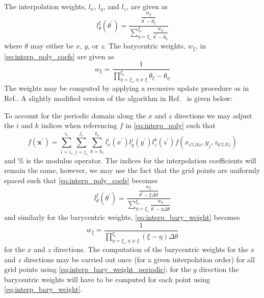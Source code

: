 \documentclass[11pt,letterpaper]{article}
\begin{document}
The interpolation weights, $l_x$, $l_y$, and $l_z$, are given as
\begin{equation}\label{eq:interp_poly_coefs}
  l_\theta^\xi(\theta^\prime) = \frac{\frac{w_\xi}{\theta^\prime - \theta_\xi}}{\sum_{\eta=\xi_s}^{\xi_e} \frac{w_{\eta}}{\theta^\prime - \theta_\eta} }
\end{equation}
where $\theta$ may either be $x$, $y$, or $z$. The barycentric weights, $w_\xi$, in \eqref{eq:interp_poly_coefs} are given as
\begin{equation}\label{eq:interp_bary_weight}
  w_\xi = \frac{1}{\prod_{\eta=\xi_s,\eta\neq \xi}^{\xi_e} \theta_\xi - \theta_\eta}
\end{equation}
The weights may be computed by applying a recursive update procedure as in Ref.\cite{Berrut2004}. A slightly modified version of the algorithm in Ref.~\cite{Berrut2004}  is given below:
\begin{algorithmic}
  \ENDFOR
  \ENDFOR
  \ENDFOR
  \ENDFOR
\end{algorithmic}

To account for the periodic domain along the $x$ and $z$ directions we may adjust the $i$ and $k$ indices when referencing $f$ in \eqref{eq:interp_poly} such that
\begin{equation}
  f(\bm{x}^\prime) = \sum_{i=i_s}^{i_e}\sum_{j=j_s}^{j_e}\sum_{k=k_s}^{k_e}  l_x^{i}(x^\prime) l_y^{j}(y^\prime) l_z^{k}(z^\prime)f(x_{i\%Nx}, y_{j}, z_{k\%Nz})
\end{equation}
and $\%$ is the modulus operator. The indices for the interpolation coefficients will remain the same, however, we may use the fact that the grid points are uniformly spaced such that \eqref{eq:interp_poly_coefs} becomes
\begin{equation}
  l_\theta^\xi(\theta^\prime) = \frac{\frac{w_\xi}{\theta^\prime - \xi \Delta\theta}}{\sum_{\eta=\xi_s}^{\xi_e} \frac{w_{\eta}}{\theta^\prime - \eta \Delta\theta} }
\end{equation}
and similarly for the barycentric weights, \eqref{eq:interp_bary_weight} becomes
\begin{equation}\label{eq:interp_bary_weight_periodic}
  w_\xi = \frac{1}{\prod_{\eta=\xi_s,\eta\neq \xi}^{\xi_e} (\xi - \eta)\Delta\theta}
\end{equation}
for the $x$ and $z$ directions. The computation of the barycentric weights for the $x$ and $z$ directions may be carried out once (for a given interpolation order) for all grid points using \eqref{eq:interp_bary_weight_periodic}; for the $y$ direction the barycentric weights will have to be computed for each point using \eqref{eq:interp_bary_weight}.
\end{document}
